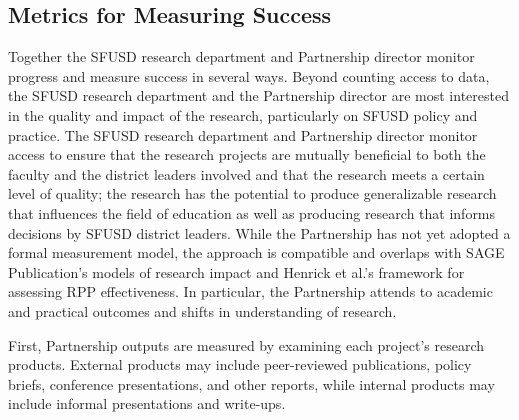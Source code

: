\hypertarget{metrics-for-measuring-success}{%
\subsection{Metrics for Measuring Success}\label{metrics-for-measuring-success}}

Together the SFUSD research department and Partnership director monitor progress and measure success in several ways. Beyond counting access to data, the SFUSD research department and the Partnership director are most interested in the quality and impact of the research, particularly on SFUSD policy and practice. The SFUSD research department and Partnership director monitor access to ensure that the research projects are mutually beneficial to both the faculty and the district leaders involved and that the research meets a certain level of quality; the research has the potential to produce generalizable research that influences the field of education as well as producing research that informs decisions by SFUSD district leaders. While the Partnership has not yet adopted a formal measurement model, the approach is compatible and overlaps with SAGE Publication's \citeyearpar{sagepublishing2019} models of research impact and Henrick et al.'s \citeyearpar{henrick2017} framework for assessing RPP effectiveness. In particular, the Partnership attends to academic and practical outcomes and shifts in understanding of research.

First, Partnership outputs are measured by examining each project's research products. External products may include peer-reviewed publications, policy briefs, conference presentations, and other reports, while internal products may include informal presentations and write-ups.

